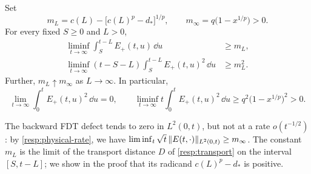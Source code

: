 \begin{theorem}
\label{resp:persistent-defect}
Set
\[
 m_L=c(L)-\bigl[c(L)^p-d_*\bigr]^{1/p},
 \qquad m_\infty=q\bigl(1-x^{1/p}\bigr)>0.
\]
For every fixed $S\ge0$ and $L>0$,
\begin{align}
 \liminf_{t\to\infty}\int_S^{t-L}E_+(t,u)\,\dd u
       &\ge m_L,\label{resp:persistent-l1}\\
 \liminf_{t\to\infty}(t-S-L)
                \int_S^{t-L}E_+(t,u)^2\,\dd u
       &\ge m_L^2.\label{resp:persistent-l2}
\end{align}
Further, $m_L\uparrow m_\infty$ as $L\to\infty$. In particular,
\begin{equation}
 \lim_{t\to\infty}\int_0^tE_+(t,u)^2\,\dd u=0,
 \qquad
 \liminf_{t\to\infty}t\int_0^tE_+(t,u)^2\,\dd u
       \ge q^2\bigl(1-x^{1/p}\bigr)^2>0.
 \label{resp:physical-rate}
\end{equation}
\end{theorem}

The backward FDT defect tends to zero in $L^2(0,t)$, but not at a rate $o(t^{-1/2})$: by \eqref{resp:physical-rate}, we have $\liminf_t\sqrt t\,\lVert E(t,\cdot)\rVert_{L^2(0,t)}\ge m_\infty$. The constant $m_L$ is the limit of the transport distance $D$ of \cref{resp:transport} on the interval $[S,t-L]$; we show in the proof that its radicand $c(L)^p-d_*$ is positive.


